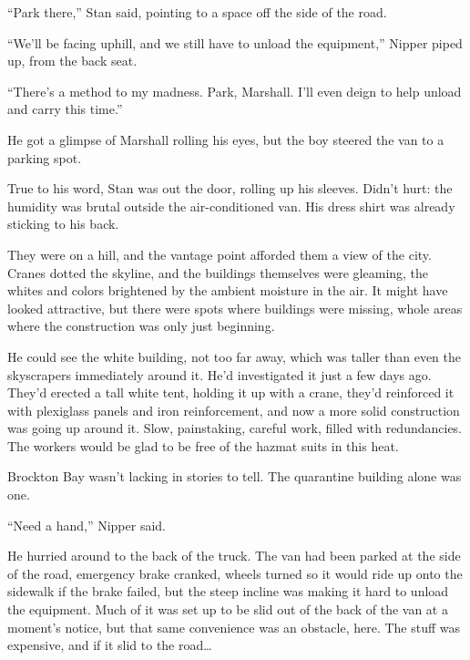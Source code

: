 





``Park there,'' Stan said, pointing to a space off the side of the road.



``We'll be facing uphill, and we still have to unload the equipment,'' Nipper piped up, from the back seat.



``There's a method to my madness.  Park, Marshall.  I'll even deign to help unload and carry this time.''



He got a glimpse of Marshall rolling his eyes, but the boy steered the van to a parking spot.



True to his word, Stan was out the door, rolling up his sleeves.  Didn't hurt: the humidity was brutal outside the air-conditioned van.  His dress shirt was already sticking to his back.



They were on a hill, and the vantage point afforded them a view of the city.  Cranes dotted the skyline, and the buildings themselves were gleaming, the whites and colors brightened by the ambient moisture in the air.  It might have looked attractive, but there were spots where buildings were missing, whole areas where the construction was only just beginning.



He could see the white building, not too far away, which was taller than even the skyscrapers immediately around it.  He'd investigated it just a few days ago.  They'd erected a tall white tent, holding it up with a crane, they'd reinforced it with plexiglass panels and iron reinforcement, and now a more solid construction was going up around it.  Slow, painstaking, careful work, filled with redundancies.  The workers would be glad to be free of the hazmat suits in this heat.



Brockton Bay wasn't lacking in stories to tell.  The quarantine building alone was one.



``Need a hand,'' Nipper said.



He hurried around to the back of the truck.  The van had been parked at the side of the road, emergency brake cranked, wheels turned so it would ride up onto the sidewalk if the brake failed, but the steep incline was making it hard to unload the equipment.  Much of it was set up to be slid out of the back of the van at a moment's notice, but that same convenience was an obstacle, here.  The stuff was expensive, and if it slid to the road\ldots



